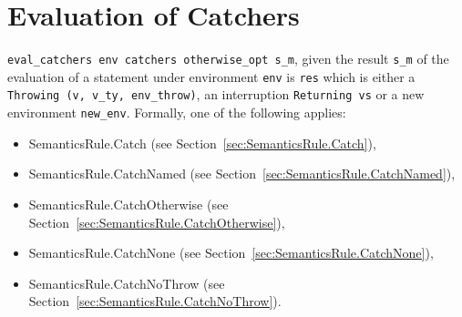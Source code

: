 \documentclass{book}
\newcommand\tododefine[1]{\texttt{#1}}
\newcommand\ordered[3]{{#1}\xrightarrow{#2}{#3}}
\newcommand\evalarrow[0]{\rightsquigarrow}
\newcommand\evalfor[1]{\texttt{eval\_for}(#1)}
\newcommand\env[0]{\texttt{env}}
\newcommand\vgone[0]{\texttt{g1}}
\newcommand\vstart[0]{\texttt{v\_start}}
\newcommand\vend[0]{\texttt{v\_end}}
\newcommand\body[0]{\texttt{body}}
\newcommand\dir[0]{\texttt{dir}}
\newcommand\condm[0]{\texttt{cond\_m}}
\newcommand\condv[0]{\texttt{cond\_v}}
\newcommand\condg[0]{\texttt{cond\_g}}
\newcommand\vindexname[0]{\texttt{index\_name}}
\begin{document}
\begin{emptyformal}

\end{emptyformal}


\chapter{Evaluation of Catchers \label{chap:eval_catchers}}
\texttt{eval\_catchers env catchers otherwise\_opt s\_m}, given the result
\texttt{s\_m} of the evaluation of a statement under environment \texttt{env}
is \texttt{res} which is either a \texttt{Throwing (v, v\_ty, env\_throw)}, an
interruption \texttt{Returning vs} or a new environment \texttt{new\_env}.
Formally, one of the following applies:
\begin{itemize}
\item SemanticsRule.Catch (see Section~\ref{sec:SemanticsRule.Catch}),
\item SemanticsRule.CatchNamed (see Section~\ref{sec:SemanticsRule.CatchNamed}),
\item SemanticsRule.CatchOtherwise (see Section~\ref{sec:SemanticsRule.CatchOtherwise}),
\item SemanticsRule.CatchNone (see Section~\ref{sec:SemanticsRule.CatchNone}),
\item SemanticsRule.CatchNoThrow (see Section~\ref{sec:SemanticsRule.CatchNoThrow}).
\end{itemize}
\end{document}
